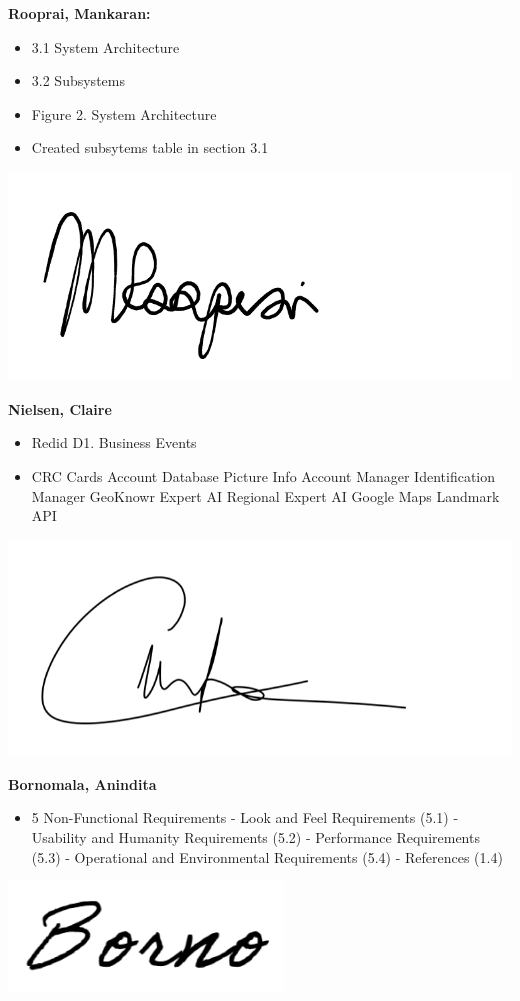 \documentclass[]{article}
\begin{document}
\textbf{Rooprai, Mankaran:}
\begin{itemize}
	\item 3.1 System Architecture
	\item 3.2 Subsystems
	\item Figure 2. System Architecture
	\item Created subsytems table in section 3.1
\end{itemize}
\includegraphics[scale=0.15]{mankaransignature.png}

\textbf{Nielsen, Claire}
\begin{itemize}
        \item Redid D1. Business Events
		\item CRC Cards
			\subitem Account Database
			\subitem Picture Info
			\subitem Account Manager
			\subitem Identification Manager
			\subitem GeoKnowr Expert AI
			\subitem Regional Expert AI
			\subitem Google Maps Landmark API
\end{itemize}
\includegraphics[scale=0.15]{clairesignature.jpg}

\textbf{Bornomala, Anindita}
\begin{itemize}
        \item 5 Non-Functional Requirements
            \subitem - Look and Feel Requirements (5.1)
            \subitem - Usability and Humanity Requirements (5.2)
            \subitem - Performance Requirements (5.3)
            \subitem - Operational and Environmental Requirements (5.4)
            \subitem - References (1.4)
\end{itemize}
\includegraphics[scale=0.50]{bornosignature.png}
\end{document}
